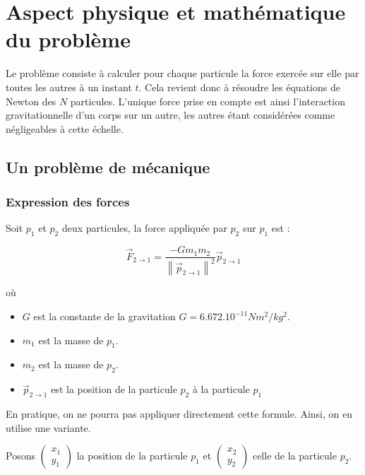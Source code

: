 \chapter{Aspect physique et mathématique du problème}
Le problème consiste à calculer pour chaque particule la force exercée sur elle par toutes les autres à un instant $t$.
Cela revient donc à résoudre les équations de Newton des $N$ particules. L'unique force prise en compte est ainsi l'interaction gravitationnelle d'un corps sur un autre, les autres étant considérées comme négligeables à cette échelle.

\section{Un problème de mécanique}
\vspace{2mm}
\subsection{Expression des forces}
\vspace{2mm}

Soit $p_{1}$ et $p_{2}$ deux particules, la force appliquée par $p_2$ sur $p_1$ est :

\begin{equation}
\vec{F}_{2 \rightarrow 1} = \frac{-Gm_1m_2}{{\left\| \vec{p}_{2 \rightarrow 1} \right\|}^2} \vec{p}_{2 \rightarrow 1}
\end{equation}

où 
\begin{itemize}
\item  $G$ est la constante de la gravitation $G = {6.672.10^{-11}}{Nm^2/kg^2}$.

\item $m_1$ est la masse de $p_1$.
\item $m_2$ est la masse de $p_2$.
\item $\vec{p}_{2 \rightarrow 1}$ est la position de la particule $p_2$ à la particule $p_1$ 


\end{itemize}

\vspace{2mm}

En pratique, on ne pourra pas appliquer directement cette formule. Ainsi, on en utilise une variante.

Posons $\begin{pmatrix}
x_1\\
y_1
\end{pmatrix}$ la position de la particule $p_1$ et $\begin{pmatrix}
x_2\\
y_2
\end{pmatrix}$ celle de la particule $p_2$.

